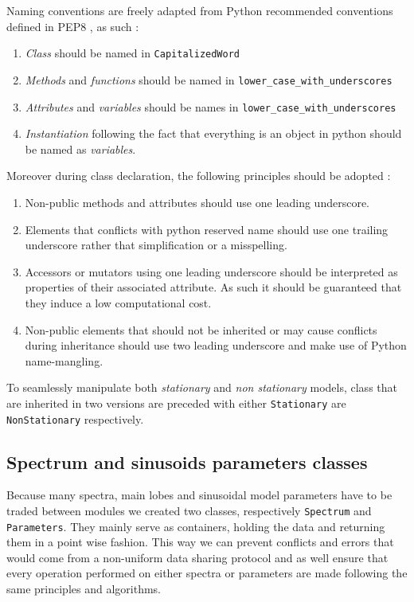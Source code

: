 \documentclass[]{article}
\begin{document}
Naming conventions are freely adapted from Python recommended conventions defined in PEP8 \cite{pep8}, as such :
\begin{enumerate}[label=(\roman*)]
	\item \emph{Class} should be named in \texttt{CapitalizedWord}
	\item \emph{Methods} and \emph{functions} should be named in \texttt{lower\_case\_with\_underscores}
	\item \emph{Attributes} and \emph{variables} should be names in \texttt{lower\_case\_with\_underscores}
	\item \emph{Instantiation} following the fact that everything is an object in python should be named as \emph{variables}.
\end{enumerate}
Moreover during class declaration, the following principles should be adopted :
\begin{enumerate}[label=(\roman*)]
	\item Non-public methods and attributes should use one leading underscore.
	\item Elements that conflicts with python reserved name should use one trailing underscore rather that simplification or a misspelling.
	\item Accessors or mutators using one leading underscore should be interpreted as properties of their associated attribute. As such it should be guaranteed that they induce a low computational cost.
	\item Non-public elements that should not be inherited or may cause conflicts during inheritance should use two leading underscore and make use of Python name-mangling.
\end{enumerate}
To seamlessly manipulate both \emph{stationary} and \emph{non stationary} models, class that are inherited in two versions are preceded with either \texttt{Stationary} are \texttt{NonStationary} respectively.
\subsection{Spectrum and sinusoids parameters classes}\label{sec:spectrums-and-sinusoids-parameters}
Because many spectra, main lobes and sinusoidal model parameters have to be traded between modules we created two classes, respectively \texttt{Spectrum} and \texttt{Parameters}. They mainly serve as containers, holding the data and returning them in a point wise fashion.
This way we can prevent conflicts and errors that would come from a non-uniform data sharing protocol and as well ensure that every operation performed on either spectra or parameters are made following the same principles and algorithms.
\end{document}
